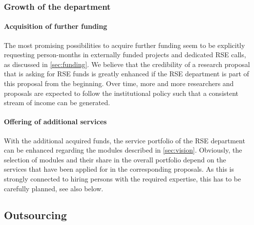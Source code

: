 \documentclass[a4paper]{article}
\begin{document}
\subsubsection{Growth of the department}

\paragraph{Acquisition of further funding}
The most promising possibilities to acquire further funding seem to be explicitly requesting person-months in externally funded projects and dedicated RSE calls, as discussed in \autoref{sec:funding}.
We believe that the credibility of a research proposal that is asking for RSE funds is greatly enhanced if the RSE department is part of this proposal from the beginning.
Over time, more and more researchers and proposals are expected to follow the institutional policy such that a consistent stream of income can be generated.

\paragraph{Offering of additional services}
With the additional acquired funds, the service portfolio of the RSE department can be enhanced regarding the modules described in \autoref{sec:vision}.
Obviously, the selection of modules and their share in the overall portfolio depend on the services that have been applied for in the corresponding proposals.
As this is strongly connected to hiring persons with the required expertise, this has to be carefully planned, see also below.


\subsection{Outsourcing}
\end{document}
